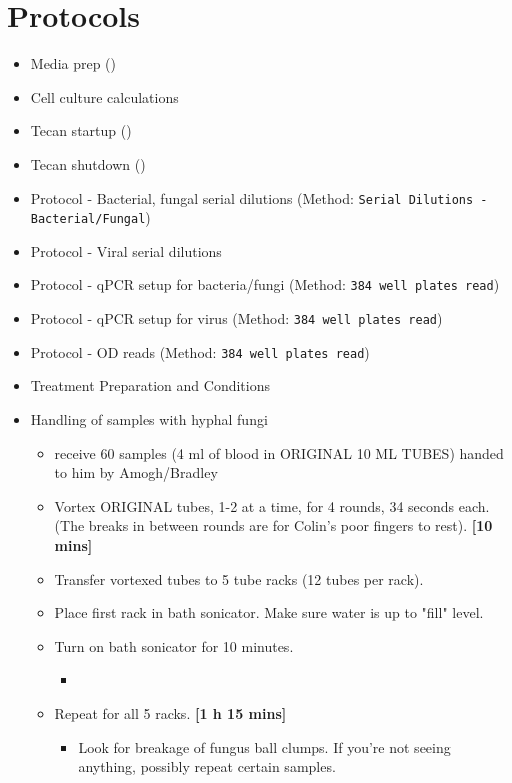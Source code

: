 \documentclass{article}
\newcounter{comments}
\newcommand{\bradley}[1]{{\addtocounter{comments}{1}}{\color{violet}{[\textbf{TODO Bradley \thecomments :}\ #1]}}}
\newcommand{\colin}[1]{{\addtocounter{comments}{1}}{\color{cyan}{[\textbf{TODO Colin \thecomments :}\ #1]}}}
\begin{document}
\section{Protocols}
\begin{itemize}
    \item Media prep ()
    \item Cell culture calculations
    \item Tecan startup ()
    \item Tecan shutdown ()
    \item Protocol - Bacterial, fungal serial dilutions (Method: \texttt{Serial Dilutions - Bacterial/Fungal})

    \item Protocol - Viral serial dilutions
    \item Protocol - qPCR setup for bacteria/fungi (Method: \texttt{384 well plates read})
    \item Protocol - qPCR setup for virus (Method: \texttt{384 well plates read})
    \item Protocol - OD reads (Method: \texttt{384 well plates read})
    \item Treatment Preparation and Conditions \bradley{}
    \item Handling of samples with hyphal fungi \colin{} 
    \begin{itemize}
        \item receive 60 samples (4 ml of blood in ORIGINAL 10 ML TUBES) handed to him by Amogh/Bradley
        \item Vortex ORIGINAL tubes, 1-2 at a time, for 4 rounds, 34 seconds each. (The breaks in between rounds are for Colin's poor fingers to rest). \textbf{[10 mins]}
        \item Transfer vortexed tubes to 5 tube racks (12 tubes per rack).
        \item Place first rack in bath sonicator. Make sure water is up to "fill" level.
        \item Turn on bath sonicator for 10 minutes. 
        \begin{itemize}
            \item 
        \end{itemize}
        \item Repeat for all 5 racks. \textbf{[1 h 15 mins]}
        \begin{itemize}
            \item Look for breakage of fungus ball clumps. If you're not seeing anything, possibly repeat certain samples.

\end{itemize}
\end{itemize}
\end{itemize}
\end{document}
